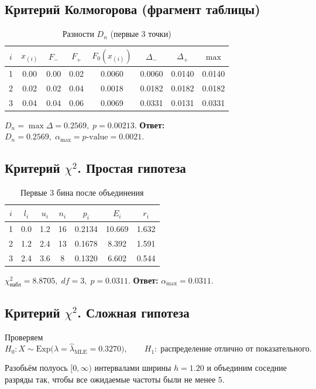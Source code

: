 \documentclass[areasetadvanced]{scrartcl}
\begin{document}
\subsection{Критерий Колмогорова (фрагмент таблицы)}
\begin{longtable}{cccccccc}
\caption{Разности \(D_{n}\) (первые 3 точки)}\label{tab:ks}\\[-1pt]\toprule
$i$ & $x_{(i)}$ & $F_{-}$ & $F_{+}$ & $F_0(x_{(i)})$ &
$\Delta_{-}$ & $\Delta_{+}$ & $\max$\\\midrule
1 & 0.00 & 0.00 & 0.02 & 0.0060 & 0.0060 & 0.0140 & 0.0140\\
2 & 0.02 & 0.02 & 0.04 & 0.0018 & 0.0182 & 0.0182 & 0.0182\\
3 & 0.04 & 0.04 & 0.06 & 0.0069 & 0.0331 & 0.0131 & 0.0331\\
\bottomrule
\end{longtable}
\(D_n=\max\Delta=0.2569,\;p=0.00213\).
\textbf{Ответ:}\;
\(D_n = 0.2569,\;
\alpha_{\max}=p\text{-value}=0.0021.\)

\newpage
\subsection{Критерий \(\chi^{2}\). Простая гипотеза}
\begin{longtable}{ccccccc}
\caption{Первые 3 бина после объединения}\label{tab:chi3}\\[-1pt]\toprule
$i$ & $l_i$ & $u_i$ & $n_i$ & $p_i$ & $E_i$ & $r_i$\\\midrule
1 & 0.0 & 1.2 & 16 & 0.2134 & 10.669 & 1.632\\
2 & 1.2 & 2.4 & 13 & 0.1678 &  8.392 & 1.591\\
3 & 2.4 & 3.6 &  8 & 0.1320 &  6.602 & 0.544\\
\bottomrule
\end{longtable}
\(\chi^2_{\text{набл}}=8.8705,\;df=3,\;p=0.0311\).
\textbf{Ответ:}\;
\(\alpha_{\max}=0.0311.\)

\subsection{Критерий \(\chi^{2}\). Сложная гипотеза}

Проверяем
\[
H_{0}: X\sim\mathrm{Exp}\!\bigl(\lambda=\hat\lambda_{\text{MLE}}=0.3270\bigr),
\qquad
H_{1}:\; \text{распределение отлично от показательного.}
\]

Разобьём полуось \([0,\infty)\) интервалами ширины \(h=1.20\)
и объединим соседние разряды так, чтобы все ожидаемые частоты
были не менее \(5\).
\end{document}
